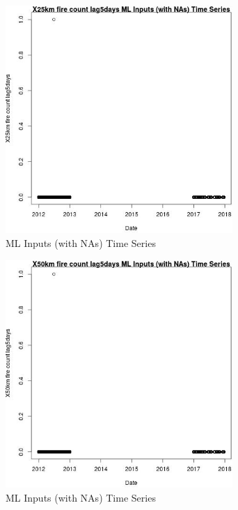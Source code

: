 \begin{figure} 
\centering  
\includegraphics[width=0.77\textwidth]{Code_Outputs/Report_ML_input_PM25_Step4_part_e_de_duplicated_aves_compiled_2019-05-14wNAs_X25km_fire_count_lag5daysvDate.jpg} 
\caption{\label{fig:Report_ML_input_PM25_Step4_part_e_de_duplicated_aves_compiled_2019-05-14wNAsX25km_fire_count_lag5daysvDate}ML Inputs (with NAs) Time Series} 
\end{figure} 
 

\clearpage 

\begin{figure} 
\centering  
\includegraphics[width=0.77\textwidth]{Code_Outputs/Report_ML_input_PM25_Step4_part_e_de_duplicated_aves_compiled_2019-05-14wNAs_X50km_fire_count_lag5daysvDate.jpg} 
\caption{\label{fig:Report_ML_input_PM25_Step4_part_e_de_duplicated_aves_compiled_2019-05-14wNAsX50km_fire_count_lag5daysvDate}ML Inputs (with NAs) Time Series} 
\end{figure} 
 


